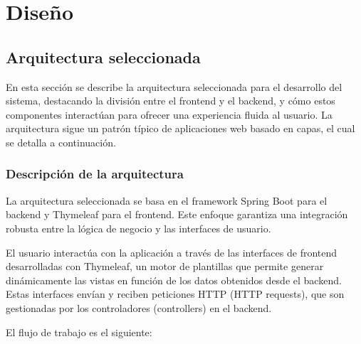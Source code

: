 \documentclass[draft]{scrbook}
\begin{document}
\chapter{Diseño} \label{disenyo}
\section{Arquitectura seleccionada}


En esta sección se describe la arquitectura seleccionada para el desarrollo del sistema, destacando la división entre el frontend y el backend, y cómo estos componentes interactúan para ofrecer una experiencia fluida al usuario. La arquitectura sigue un patrón típico de aplicaciones web basado en capas, el cual se detalla a continuación.

\subsection{Descripción de la arquitectura}

La arquitectura seleccionada se basa en el framework Spring Boot para el backend y Thymeleaf para el frontend. Este enfoque garantiza una integración robusta entre la lógica de negocio y las interfaces de usuario.

El usuario interactúa con la aplicación a través de las interfaces de frontend desarrolladas con Thymeleaf, un motor de plantillas que permite generar dinámicamente las vistas en función de los datos obtenidos desde el backend. Estas interfaces envían y reciben peticiones HTTP (HTTP requests), que son gestionadas por los controladores (controllers) en el backend.

El flujo de trabajo es el siguiente:
\end{document}
